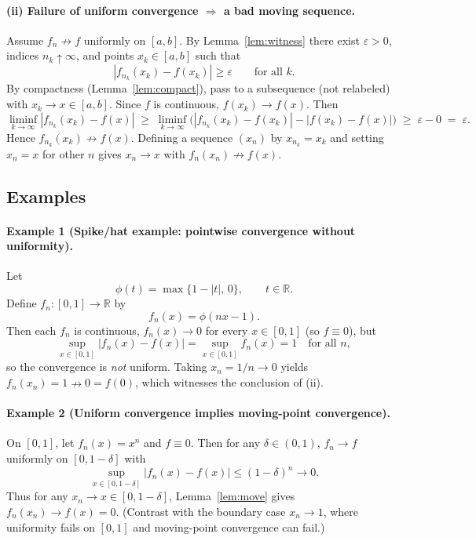 \documentclass[12pt,a4paper]{article}
\theoremstyle{plain}
\theoremstyle{definition}
\theoremstyle{remark}
\theoremstyle{remark}
\begin{document}
\paragraph{(ii) Failure of uniform convergence $\Rightarrow$ a bad moving sequence.}
Assume $f_n \not\to f$ uniformly on $[a,b]$. By Lemma~\ref{lem:witness} there exist $\varepsilon>0$, indices $n_k\uparrow\infty$,
and points $x_k\in[a,b]$ such that
\[
|f_{n_k}(x_k)-f(x_k)| \ge \varepsilon \qquad \text{for all } k.
\]
By compactness (Lemma~\ref{lem:compact}), pass to a subsequence (not relabeled) with $x_k\to x\in[a,b]$.
Since $f$ is continuous, $f(x_k)\to f(x)$. Then
\[
\liminf_{k\to\infty} |f_{n_k}(x_k)-f(x)|
\;\ge\; \liminf_{k\to\infty}\Big(|f_{n_k}(x_k)-f(x_k)| - |f(x_k)-f(x)|\Big)
\;\ge\; \varepsilon - 0 \;=\; \varepsilon.
\]
Hence $f_{n_k}(x_k)\not\to f(x)$. Defining a sequence $(x_n)$ by $x_{n_k}=x_k$ and setting $x_n=x$ for other $n$
gives $x_n\to x$ with $f_n(x_n)\not\to f(x)$.

\subsection*{Examples}

\paragraph{Example 1 (Spike/hat example: pointwise convergence without uniformity).}
Let
\[
\phi(t) = \max\{1-|t|,\,0\}, \qquad t\in\mathbb{R}.
\]
Define $f_n:[0,1]\to\mathbb{R}$ by
\[
f_n(x) = \phi(nx-1).
\]
Then each $f_n$ is continuous, $f_n(x)\to 0$ for every $x\in[0,1]$ (so $f\equiv 0$), but
\[
\sup_{x\in[0,1]}|f_n(x)-f(x)|=\sup_{x\in[0,1]} f_n(x)=1 \quad \text{for all } n,
\]
so the convergence is \emph{not} uniform. Taking $x_n=1/n\to 0$ yields $f_n(x_n)=1\nrightarrow 0=f(0)$,
which witnesses the conclusion of (ii).

\paragraph{Example 2 (Uniform convergence implies moving-point convergence).}
On $[0,1]$, let $f_n(x)=x^n$ and $f\equiv 0$. Then for any $\delta\in(0,1)$, $f_n\to f$ uniformly on $[0,1-\delta]$ with
\[
\sup_{x\in[0,1-\delta]}|f_n(x)-f(x)| \le (1-\delta)^n \to 0.
\]
Thus for any $x_n\to x\in[0,1-\delta]$, Lemma~\ref{lem:move} gives $f_n(x_n)\to f(x)=0$.
(Contrast with the boundary case $x_n\to 1$, where uniformity fails on $[0,1]$ and moving-point convergence can fail.)
\end{document}
